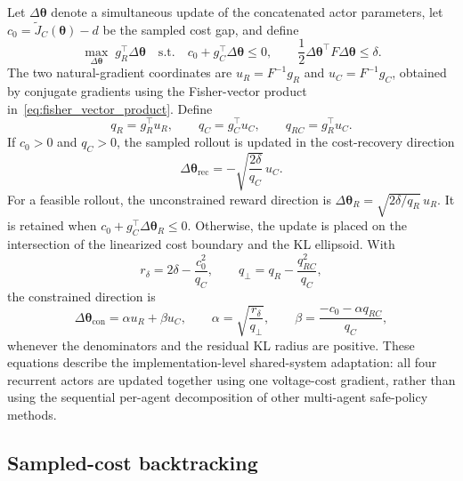\documentclass[final,5p,times]{elsarticle}
\begin{document}
Let $\Delta\boldsymbol{\theta}$ denote a simultaneous update of the concatenated actor parameters, let $c_0=\widetilde J_C(\boldsymbol{\theta})-d$ be the sampled cost gap, and define
\begin{equation}
  \label{eq:local_constrained_update}
  \max_{\Delta\boldsymbol{\theta}}\; g_R^{\top}\Delta\boldsymbol{\theta}
  \quad\mathrm{s.t.}\quad c_0+g_C^{\top}\Delta\boldsymbol{\theta}\leq0,\qquad
  \frac{1}{2}\Delta\boldsymbol{\theta}^{\top}F\Delta\boldsymbol{\theta}\leq\delta.
\end{equation}
The two natural-gradient coordinates are $u_R=F^{-1}g_R$ and $u_C=F^{-1}g_C$, obtained by conjugate gradients using the Fisher-vector product in~\eqref{eq:fisher_vector_product}. Define
\begin{equation}
  q_R=g_R^{\top}u_R,\qquad q_C=g_C^{\top}u_C,\qquad q_{RC}=g_R^{\top}u_C.
\end{equation}
If $c_0>0$ and $q_C>0$, the sampled rollout is updated in the cost-recovery direction
\begin{equation}
  \label{eq:recovery_direction}
  \Delta\boldsymbol{\theta}_{\mathrm{rec}}=-\sqrt{\frac{2\delta}{q_C}}\,u_C.
\end{equation}
For a feasible rollout, the unconstrained reward direction is $\Delta\boldsymbol{\theta}_R=\sqrt{2\delta/q_R}\,u_R$. It is retained when $c_0+g_C^{\top}\Delta\boldsymbol{\theta}_R\leq0$. Otherwise, the update is placed on the intersection of the linearized cost boundary and the KL ellipsoid. With
\begin{equation}
  r_\delta=2\delta-\frac{c_0^2}{q_C},\qquad
  q_\perp=q_R-\frac{q_{RC}^2}{q_C},
\end{equation}
the constrained direction is
\begin{equation}
  \label{eq:intersection_direction}
  \Delta\boldsymbol{\theta}_{\mathrm{con}}=\alpha u_R+\beta u_C,\qquad
  \alpha=\sqrt{\frac{r_\delta}{q_\perp}},\qquad
  \beta=\frac{-c_0-\alpha q_{RC}}{q_C},
\end{equation}
whenever the denominators and the residual KL radius are positive. These equations describe the implementation-level shared-system adaptation: all four recurrent actors are updated together using one voltage-cost gradient, rather than using the sequential per-agent decomposition of other multi-agent safe-policy methods.

\subsection{Sampled-cost backtracking}
\label{sec:backtracking}
\end{document}

